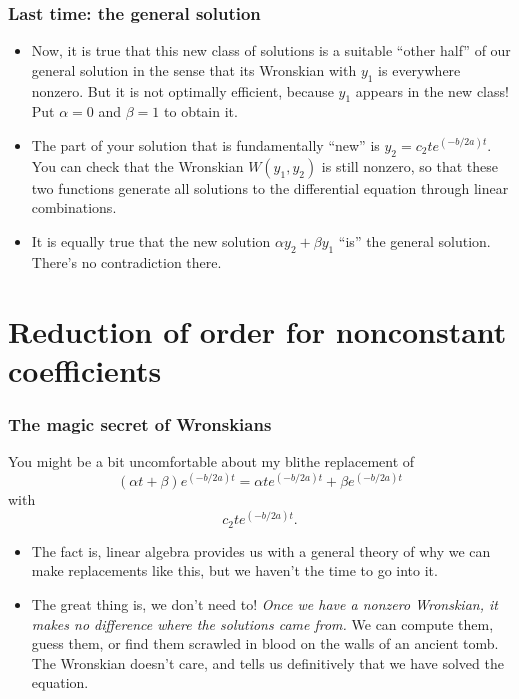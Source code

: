 \begin{frame}

\frametitle{Last time: the general solution}
\label{lasttime:thegeneralsolution}

\begin{itemize}
\item Now, it is true that this new class of solutions is a suitable ``other half'' of our general solution in the sense that its Wronskian with $ y_1 $ is everywhere nonzero. But it is not optimally efficient, because $ y_1 $ appears in the new class! Put $ \alpha = 0 $ and $ \beta = 1 $ to obtain it.

\item The part of your solution that is fundamentally ``new'' is $ y_2 = c_2 te^{(-b/2a)t} $. You can check that the Wronskian $ W(y_1, y_2) $ is still nonzero, so that these two functions generate all solutions to the differential equation through linear combinations.

\item It is equally true that the new solution $ \alpha y_2 + \beta y_1 $ ``is'' the general solution. There's no contradiction there.

\end{itemize}

\end{frame}

\section{Reduction of order for nonconstant coefficients}
\label{reductionoforderfornonconstantcoefficients}

\begin{frame}

\frametitle{The magic secret of Wronskians}
\label{themagicsecretofwronskians}

You might be a bit uncomfortable about my blithe replacement of
\[ (\alpha t + \beta) e^{(-b/2a)t}  = \alpha t e^{(-b/2a)t} + \beta e^{(-b/2a)t}\]
with
\[ c_2 t e^{(-b/2a)t}. \]

\begin{itemize}
\item The fact is, linear algebra provides us with a general theory of why we can make replacements like this, but we haven't the time to go into it.
 \pause 

\item The great thing is, we don't need to! \emph{Once we have a nonzero Wronskian, it makes no difference where the solutions came from.} We can compute them, \pause guess them, \pause or find them scrawled in blood on the walls of an ancient tomb. The Wronskian doesn't care, and tells us definitively that we have solved the equation.

\end{itemize}

\end{frame}

